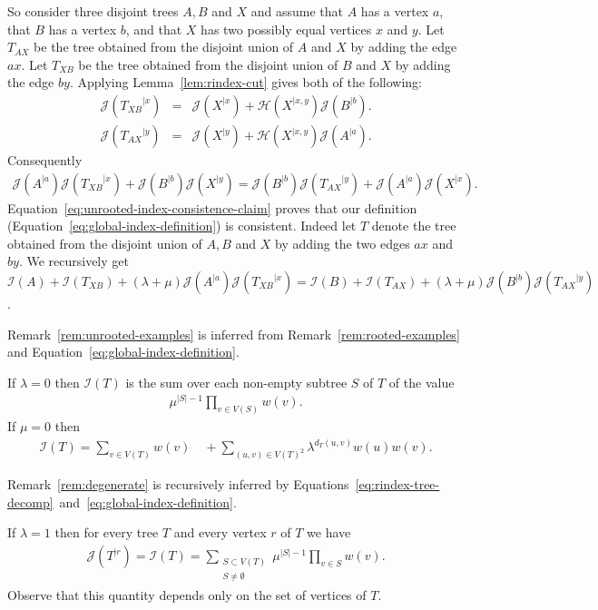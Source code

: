\documentclass[11 pt]{modarticle}
\newcommand{\wmap}{w}
\newcommand{\size}[1]{|#1|}
\newcommand{\vsetof}[1]{V(#1)}
\newcommand{\distance}[3]{d_{#3}(#1,#2)}
\newcommand{\rtree}[2]{{#1}^{\lvert #2}}
\newcommand{\indexsymbol}{\mathcal{I}}
\newcommand{\tindex}[1]{\indexsymbol(#1)}
\newcommand{\rindexsymbol}{\mathcal{J}}
\newcommand{\rindex}[2]{\rindexsymbol(\rtree{#2}{#1})}
\newcommand{\aindexsymbol}{\mathcal{H}}
\newcommand{\aindex}[3]{\aindexsymbol(\rtree{#3}{#1, #2})}
\begin{document}
So consider three disjoint trees $A, B$ and $X$ and assume that $A$ has a vertex $a$, that $B$ has a vertex $b$, and that $X$ has two possibly equal vertices $x$ and $y$. Let $T_{AX}$ be the tree obtained from the disjoint union of $A$ and $X$ by adding the edge $ax$. Let $T_{XB}$ be the tree obtained from the disjoint union of $B$ and $X$ by adding the edge $by$. Applying Lemma~\ref{lem:rindex-cut} gives both of the following:
\begin{eqnarray*}
	\rindex{x}{T_{XB}} & = & \rindex{x}{X} + \aindex{x}{y}{X} \rindex{b}{B}. \\
	\rindex{y}{T_{AX}} & = & \rindex{y}{X} + \aindex{x}{y}{X} \rindex{a}{A}.
\end{eqnarray*} 
Consequently
\begin{eqnarray}
	\rindex{a}{A} \rindex{x}{T_{XB}} + \rindex{b}{B} \rindex{y}{X} = \rindex{b}{B} \rindex{y}{T_{AX}} + \rindex{a}{A} \rindex{x}{X}. \label{eq:unrooted-index-consistence-claim}
\end{eqnarray}
Equation~\eqref{eq:unrooted-index-consistence-claim} proves that our definition (Equation~\eqref{eq:global-index-definition}) is consistent. Indeed let $T$ denote the tree obtained from the disjoint union of $A,B$ and $X$ by adding the two edges $ax$ and $by$. We recursively get $\tindex{A} + \tindex{T_{XB}} + (\lambda + \mu) \rindex{a}{A} \rindex{x}{T_{XB}} = \tindex{B} + \tindex{T_{AX}} + (\lambda + \mu) \rindex{b}{B} \rindex{y}{T_{AX}}$.

Remark~\ref{rem:unrooted-examples} is inferred from Remark~\ref{rem:rooted-examples} and Equation~\eqref{eq:global-index-definition}.

\begin{rem}\label{rem:unrooted-examples}
If $\lambda = 0$ then $\tindex{T}$ is the sum over each non-empty subtree $S$ of $T$ of the value
\begin{eqnarray*}
	\mu^{\size{S}-1} \underset{v \in \vsetof{S}}{\prod} \wmap(v).
\end{eqnarray*}
If $\mu = 0$ then 
\begin{eqnarray*}
	\tindex{T} = {\sum_{v\in\vsetof{T}} \wmap(v) } \quad + \sum_{(u,v)\in\vsetof{T}^2} \lambda^{\distance{u}{v}{T}} \wmap(u) \wmap(v).
\end{eqnarray*}
\end{rem}

Remark~\ref{rem:degenerate} is recursively inferred by Equations~\eqref{eq:rindex-tree-decomp}~and~\eqref{eq:global-index-definition}.

\begin{rem}\label{rem:degenerate}
If $\lambda = 1$ then for every tree $T$ and every vertex $r$ of $T$ we have
\begin{eqnarray*}
	\rindex{r}{T} = \tindex{T} = \sum_{\substack{S \subset \vsetof{T}\\S\neq \emptyset}} \mu^{\size{S}-1} \underset{v \in S}{\prod} \wmap(v).
\end{eqnarray*}
Observe that this quantity depends only on the set of vertices of $T$.
\end{rem}
\end{document}
